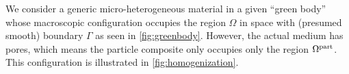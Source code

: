 \documentclass[MikaelDissertation.tex]{subfiles}
\begin{document}
We consider a generic micro-heterogeneous material in a given ``green body'' whose macroscopic configuration occupies the region $\Omega$ in space with (presumed smooth) boundary $\Gamma$ as seen in \cref{fig:greenbody}.
However, the actual medium has pores, which means the particle composite only occupies only the region $\Omega^{\mathrm{part}}$.
This configuration is illustrated in \cref{fig:homogenization}.
\end{document}
